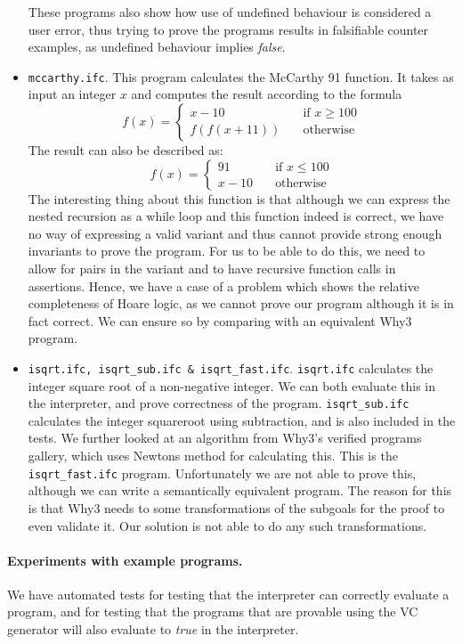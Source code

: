 \begin{itemize}
	These programs also show how use of undefined behaviour is considered a user error, thus trying to prove the programs results in falsifiable counter examples, as undefined behaviour implies \textit{false}.

  \item{\texttt{mccarthy.ifc}.}
   This program calculates the McCarthy 91 function. It takes as input an integer $x$ and computes the result according to the formula
	\[ f(x) =
	  \begin{cases}
	    x - 10       & \quad \text{if } x \ge 100 \\
	    f(f(x + 11))  & \quad \text{otherwise}
	  \end{cases}
  \]
  The result can also be described as:
	\[ f(x) =
	  \begin{cases}
	    91       & \quad \text{if } x \leq 100 \\
	    x - 10   & \quad \text{otherwise}
	  \end{cases}
	\]
  The interesting thing about this function is that although we can express the nested recursion as a while loop and this function indeed is correct, we have no way of expressing a valid variant and thus cannot provide strong enough invariants to prove the program.
        For us to be able to do this, we need to allow for pairs in the variant and to have recursive function calls in assertions.
        Hence, we have a case of a problem which shows the relative completeness of Hoare logic, as we cannot prove our program although it is in fact correct. We can ensure so by comparing with an equivalent Why3 program.
  \item{\texttt{isqrt.ifc, isqrt\_sub.ifc \& isqrt\_fast.ifc}.}
        \texttt{isqrt.ifc} calculates the integer square root of a non-negative integer. We can both evaluate this in the interpreter, and prove correctness of the program.
        \texttt{isqrt\_sub.ifc} calculates the integer squareroot using subtraction, and is also included in the tests.
        We further looked at an algorithm from Why3's verified programs gallery, which uses Newtons method for calculating this. This is the \texttt{isqrt\_fast.ifc} program.
        Unfortunately we are not able to prove this, although we can write a semantically equivalent program. The reason for this is that Why3 needs to some transformations of the subgoals for the proof to even validate it. Our solution is not able to do any such transformations.
\end{itemize}

\paragraph{Experiments with example programs.}
We have automated tests for testing that the interpreter can correctly evaluate a program,
and for testing that the programs that are provable using the VC generator will also evaluate to \textit{true} in the interpreter.

